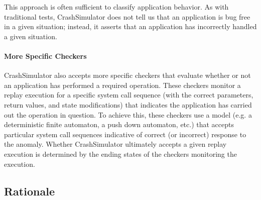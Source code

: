     This approach is often sufficient to classify application behavior. %
    As
    with traditional tests, CrashSimulator does not tell us that an application is
    bug free in a given situation; instead, it asserts that an application
    has incorrectly handled a given situation.
    

    \paragraph{More Specific Checkers}

    CrashSimulator also accepts more specific checkers that evaluate whether or
    not an application has performed a required operation.  These checkers
    monitor a replay execution for a specific system call sequence (with the
    correct parameters, return values, and state modifications) that indicates
    the application has carried out the operation in question.  To achieve this,
    these checkers use a model (e.g. a deterministic finite
    automaton, a push down automaton, etc.) that accepts particular system
    call sequences indicative of correct (or incorrect) response
    to the anomaly.  Whether CrashSimulator
    ultimately accepts a given replay execution is determined by the ending
    states of the checkers monitoring the execution.


    
\subsection{Rationale}

